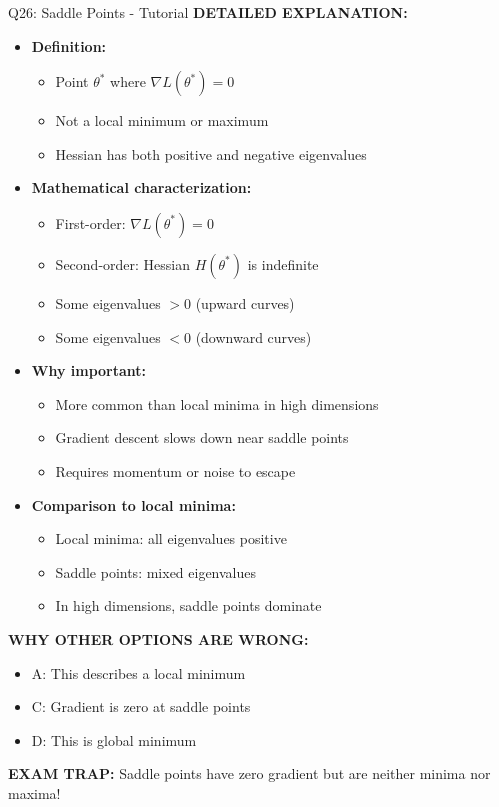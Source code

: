 \documentclass[8pt]{beamer}
\begin{document}
\begin{frame}{Q26: Saddle Points - Tutorial}
		\vspace{0.05cm}
		\textbf{DETAILED EXPLANATION:}
		\begin{itemize}
			\item \textbf{Definition:}
			\begin{itemize}
				\item Point $\theta^*$ where $\nabla L(\theta^*) = 0$
				\item Not a local minimum or maximum
				\item Hessian has both positive and negative eigenvalues
			\end{itemize}
			\item \textbf{Mathematical characterization:}
			\begin{itemize}
				\item First-order: $\nabla L(\theta^*) = 0$
				\item Second-order: Hessian $H(\theta^*)$ is indefinite
				\item Some eigenvalues $> 0$ (upward curves)
				\item Some eigenvalues $< 0$ (downward curves)
			\end{itemize}
			\item \textbf{Why important:}
			\begin{itemize}
				\item More common than local minima in high dimensions
				\item Gradient descent slows down near saddle points
				\item Requires momentum or noise to escape
			\end{itemize}
			\item \textbf{Comparison to local minima:}
			\begin{itemize}
				\item Local minima: all eigenvalues positive
				\item Saddle points: mixed eigenvalues
				\item In high dimensions, saddle points dominate
			\end{itemize}
		\end{itemize}
		
		\vspace{0.05cm}
		\textcolor{myred}{\textbf{WHY OTHER OPTIONS ARE WRONG:}}
		\begin{itemize}
			\item \textcolor{myred}{A:} This describes a local minimum
			\item \textcolor{myred}{C:} Gradient is zero at saddle points
			\item \textcolor{myred}{D:} This is global minimum
		\end{itemize}
		
		\textcolor{myred}{\textbf{EXAM TRAP:}} Saddle points have \textcolor{myblue}{zero gradient} but are neither minima nor maxima!
	\end{frame}
	
\end{document}
